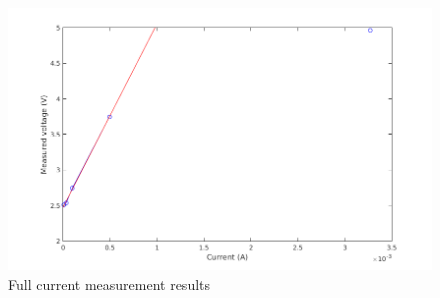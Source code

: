 \documentclass[11pt]{article} %
\begin{document}
\begin{figure}[]
	\centering
	\includegraphics[width=\textwidth]{5points-current.png}
	\caption{Full current measurement results}
 	\label{fig:current}
\end{figure}
\end{document}
